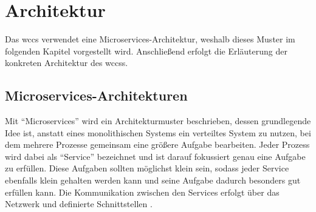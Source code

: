 \section{Architektur}
    \label{section:Architecture}
    Das \gls{wccs} verwendet eine Microservices-Architektur,
    weshalb dieses Muster im folgenden Kapitel vorgestellt wird.
    Anschließend erfolgt die Erläuterung der konkreten Architektur des \glspl{wccs}.

    \subsection{Microservices-Architekturen}
        \label{section:conceptMicroServices}
        Mit "`Microservices"' wird ein Architekturmuster beschrieben,
        dessen grundlegende Idee ist, anstatt eines monolithischen Systems
        ein verteiltes System zu nutzen, bei dem mehrere Prozesse gemeinsam
        eine größere Aufgabe bearbeiten.
        Jeder Prozess wird dabei als "`Service"' bezeichnet und ist darauf
        fokussiert genau eine Aufgabe zu erfüllen.
        Diese Aufgaben sollten möglichst klein sein,
        sodass jeder Service ebenfalls klein gehalten werden kann und seine
        Aufgabe dadurch besonders gut erfüllen kann.
        Die Kommunikation zwischen den Services erfolgt über das Netzwerk
        und definierte Schnittstellen
        \cite[Kapitel 1.1]{newman:microservices}.

